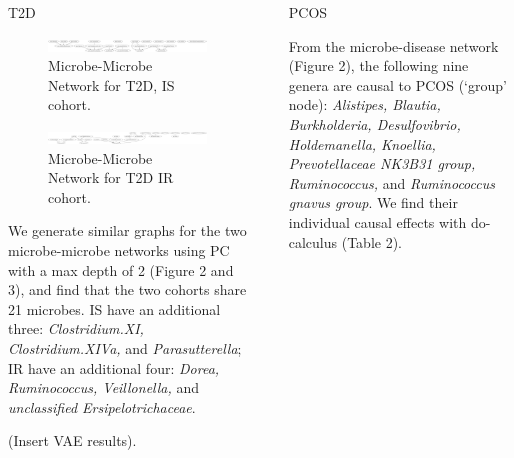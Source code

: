 \documentclass[final]{beamer}
\newlength{\sepwidth}
\newlength{\colwidth}
\newcommand{\separatorcolumn}{\begin{column}{\sepwidth}\end{column}}
\begin{document}
\begin{frame}[t]
\begin{columns}[t]
\begin{column}{\colwidth}
\begin{block}{T2D}
    
    
    \begin{figure}
    	\centering
	\includegraphics[width=\linewidth]{../graphs/t2d/glasso_IS_norm.png}
	\caption{Microbe-Microbe Network for T2D, IS cohort.}
    \end{figure}
    
    \begin{figure}
	\includegraphics[width=\linewidth]{../graphs/t2d/glasso_IR_norm.png}
	\caption{Microbe-Microbe Network for T2D IR cohort.}
    \end{figure}
    
    We generate similar graphs for the two microbe-microbe networks using PC with a max depth of 2 (Figure 2 and 3), and find that the two cohorts share 21 microbes. IS have an additional three: \textit{Clostridium.XI, Clostridium.XIVa,} and \textit{Parasutterella}; IR have an additional four: \textit{Dorea, Ruminococcus, Veillonella,} and \textit{unclassified Ersipelotrichaceae}. 
    
    (Insert VAE results).

  \end{block}

  
\end{column}

\separatorcolumn

\begin{column}{\colwidth}

   \begin{block}{PCOS}

    From the microbe-disease network (Figure 2), the following nine genera are causal to PCOS (`group' node): \textit{Alistipes, Blautia, Burkholderia, Desulfovibrio, Holdemanella, Knoellia, Prevotellaceae NK3B31 group, Ruminococcus,} and \textit{Ruminococcus gnavus group}. We find their individual causal effects with do-calculus (Table 2). 


\end{block}
\end{column}
\end{columns}
\end{frame}
\end{document}
